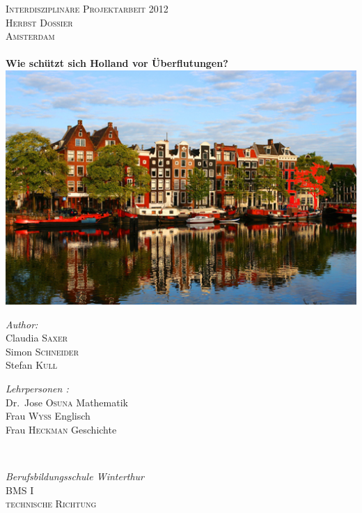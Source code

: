 
\begin{titlepage}

\begin{center}


\textsc{\LARGE Interdisziplinäre Projektarbeit 2012}\\[0.5cm]
\textsc{\LARGE Herbst Dossier}\\[1.5cm]

\textsc{\Large Amsterdam}\\[0.5cm]

 
\HRule \\[0.3cm] 
{ \huge \bfseries Wie schützt sich Holland vor Überflutungen?}
\HRule \\[0.3cm] 


\includegraphics[width=1\textwidth]{titelbild.jpg}
\cite{titelbild}   
\\[1cm]   
 
 
\begin{minipage}{0.4\textwidth}
\begin{flushleft} \large
\emph{Author:}
\\Claudia \textsc{Saxer}
\\Simon \textsc{Schneider}
\\Stefan \textsc{Kull}
\end{flushleft}
\end{minipage}
\begin{minipage}{0.5\textwidth}
\begin{flushright} \large
\emph{Lehrpersonen :} 
\\Dr.~Jose \textsc{Osuna}  \textnormal{Mathematik}
\\Frau \textsc{Wyss} \textnormal{Englisch}
\\Frau \textsc{Heckman} \textnormal{Geschichte}
\end{flushright}
\end{minipage}
\\[1.4cm]
\begin{minipage}{0.5\textwidth}
\begin{center} \large
\emph{Berufsbildungsschule Winterthur} 
\\ \textsc{BMS I}
\\ \textsc{technische Richtung }
\end{center}
\end{minipage}


\end{center}
\end{titlepage}
